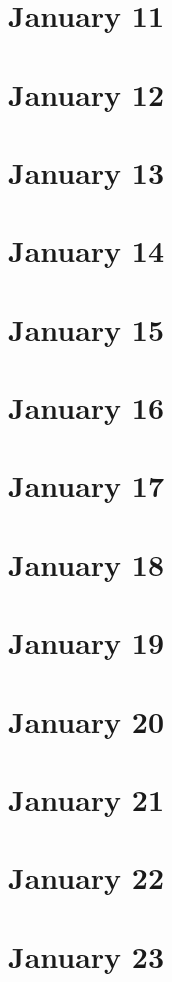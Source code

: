 \section{January 11}

\section{January 12}

\section{January 13}

\section{January 14}

\section{January 15}

\section{January 16}

\section{January 17}

\section{January 18}

\section{January 19}

\section{January 20}

\section{January 21}

\section{January 22}

\section{January 23}

